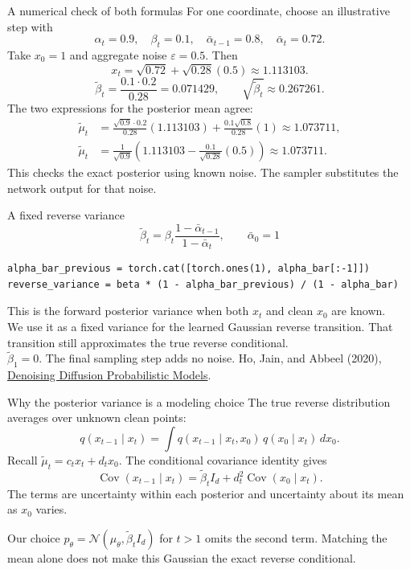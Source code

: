 \documentclass[aspectratio=169,11pt]{beamer}
\newcommand{\ddpmref}{\vfill{\tiny\color{gray}Ho, Jain, and Abbeel (2020), \href{https://arxiv.org/abs/2006.11239}{Denoising Diffusion Probabilistic Models}.}}
\begin{document}
\begin{frame}{A numerical check of both formulas}
\small
For one coordinate, choose an illustrative step with
\[\alpha_t=0.9,\quad\beta_t=0.1,\quad\bar\alpha_{t-1}=0.8,
\quad\bar\alpha_t=0.72.\]
Take $x_0=1$ and aggregate noise $\varepsilon=0.5$. Then
\[x_t=\sqrt{0.72}+\sqrt{0.28}(0.5)\approx1.113103.\]
\[\tilde\beta_t=\frac{0.1\cdot0.2}{0.28}=0.071429,
\qquad \sqrt{\tilde\beta_t}\approx0.267261.\]
The two expressions for the posterior mean agree:
\begin{align*}
\tilde\mu_t&=\frac{\sqrt{0.9}\cdot0.2}{0.28}(1.113103)
+\frac{0.1\sqrt{0.8}}{0.28}(1)\approx1.073711,\\[1mm]
\tilde\mu_t&=\frac1{\sqrt{0.9}}\left(1.113103-
\frac{0.1}{\sqrt{0.28}}(0.5)\right)\approx1.073711.
\end{align*}
This checks the exact posterior using known noise. The sampler substitutes the network output for that noise.
\end{frame}

\begin{frame}[fragile]{A fixed reverse variance}
\[\tilde\beta_t=\beta_t\frac{1-\bar\alpha_{t-1}}{1-\bar\alpha_t},\qquad\bar\alpha_0=1\]
\begin{lstlisting}[basicstyle=\ttfamily\footnotesize]
alpha_bar_previous = torch.cat([torch.ones(1), alpha_bar[:-1]])
reverse_variance = beta * (1 - alpha_bar_previous) / (1 - alpha_bar)
\end{lstlisting}
\small
This is the forward posterior variance when both $x_t$ and clean $x_0$ are known.\\[3mm]
We use it as a fixed variance for the learned Gaussian reverse transition. That transition still approximates the true reverse conditional.\\[3mm]
$\tilde\beta_1=0$. The final sampling step adds no noise.
\ddpmref
\end{frame}

\begin{frame}{Why the posterior variance is a modeling choice}
The true reverse distribution averages over unknown clean points:
\[q(x_{t-1}\mid x_t)=\int q(x_{t-1}\mid x_t,x_0)\,q(x_0\mid x_t)\,dx_0.\]
Recall $\tilde\mu_t=c_tx_t+d_tx_0$. The conditional covariance identity gives
\[\boxed{\operatorname{Cov}(x_{t-1}\mid x_t)
=\tilde\beta_t I_d+d_t^2\operatorname{Cov}(x_0\mid x_t).}\]
The terms are uncertainty within each posterior and uncertainty about its mean as $x_0$ varies.
\par\vspace{3mm}
Our choice $p_\theta=\mathcal N(\mu_\theta,\tilde\beta_t I_d)$ for $t>1$ omits the second term. Matching the mean alone does not make this Gaussian the exact reverse conditional.
\end{frame}
\end{document}
